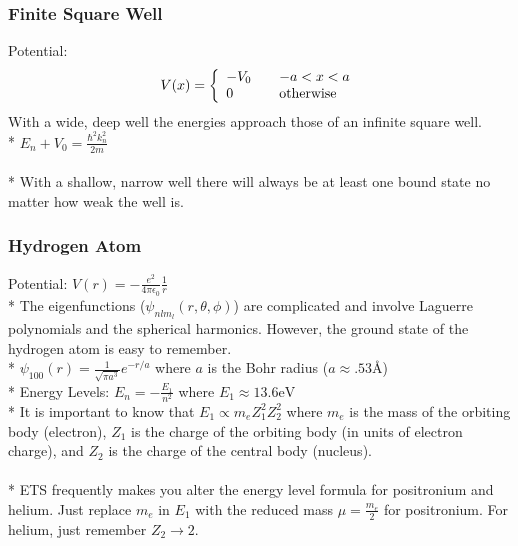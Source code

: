 \subsubsection{Finite Square Well}
Potential: \[V(x) = \left\{
\begin{array}{l l}
  -V_0 & \quad \mbox{\(-a<x<a\)}\\
  0 & \quad \mbox{otherwise}\\ \end{array} \right. \]
With a wide, deep well the energies approach those of an infinite square well.\\*
\(\displaystyle E_n+V_0=\frac{\hbar^2k_n^2}{2m}\)\\\\*
With a shallow, narrow well there will always be at least one bound state no matter how weak the well is.
\newpage
\subsubsection{Hydrogen Atom}
Potential: \(\displaystyle V(r)=-\frac{e^2}{4\pi\epsilon_0}\frac{1}{r}\)\\*
The eigenfunctions (\(\psi_{nlm_l}(r,\theta,\phi)\)) are complicated and involve Laguerre polynomials and the spherical harmonics.
However, the ground state of the hydrogen atom is easy to remember.\\*
\(\displaystyle\psi_{100}(r)=\frac{1}{\sqrt{\pi a^3}}e^{-r/a}\) where \(a\) is the Bohr radius (\(a\approx .53\mathrm{\text{\AA}}\))\\*
Energy Levels: \(\displaystyle E_n=-\frac{E_1}{n^2}\) where \(E_1\approx 13.6\mathrm{eV}\)\\*
It is important to know that \(E_1\propto m_eZ_1^2Z_2^2\) where \(m_e\) is the mass of the orbiting body (electron), \(Z_1\) is the charge of the orbiting body (in units of electron charge), and \(Z_2\) is the charge of the central body (nucleus).\\\\*
ETS frequently makes you alter the energy level formula for positronium and helium.
Just replace \(m_e\) in \(E_1\) with the reduced mass \(\mu=\frac{m_e}{2}\) for positronium.
For helium, just remember \(Z_2\to 2\).

